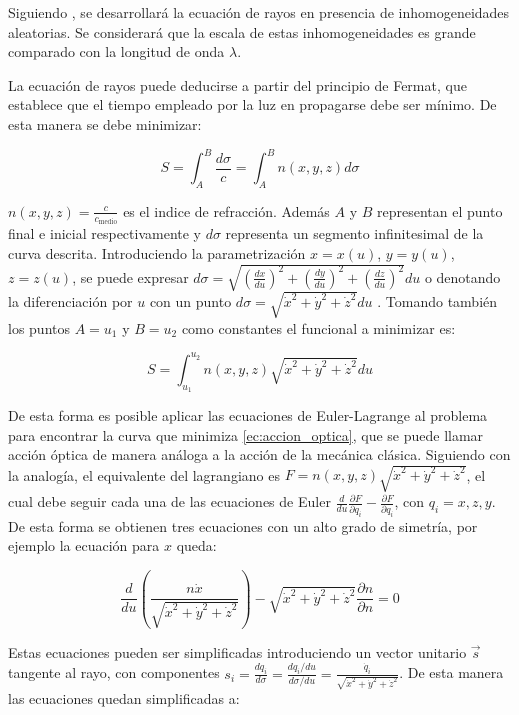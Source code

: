 Siguiendo \cite{chernov_wave_1967}, se desarrollará la ecuación de rayos en presencia de inhomogeneidades aleatorias. Se considerará que la escala de estas inhomogeneidades es grande comparado con la longitud de onda $\lambda$.

La ecuación de rayos puede deducirse a partir del principio de Fermat, que establece que el tiempo empleado por la luz en propagarse debe ser mínimo. De esta manera se debe minimizar: 

\begin{equation}
    S = \int_A^B\frac{d\sigma}{c} = \int_A^B n(x, y, z)d\sigma
\end{equation}

$n(x, y, z) = \frac{c}{c_{\text{medio}}}$ es el indice de refracción. Además $A$ y $B$ representan el punto final e inicial respectivamente y $d\sigma$ representa un segmento infinitesimal de la curva descrita. Introduciendo la parametrización $x = x(u)$, $y = y(u)$, $z = z(u)$, se puede expresar $d\sigma = \sqrt{\left(\frac{dx}{du}\right)^2 + \left(\frac{dy}{du}\right)^2 + \left(\frac{dz}{du}\right)^2}du$ o denotando la diferenciación por $u$ con un punto $d\sigma = \sqrt{\dot x^2 + \dot y^2 + \dot z^2}du$ . Tomando también los puntos $A = u_1$ y $B = u_2$ como constantes el funcional a minimizar es: 

\begin{equation}\label{ec:accion_optica}
    S = \int_{u_1}^{u_2}n(x, y, z)\sqrt{\dot x^2 + \dot y^2 + \dot z^2}du
\end{equation}

De esta forma es posible aplicar las ecuaciones de Euler-Lagrange al problema para encontrar la curva que minimiza \ref{ec:accion_optica}, que se puede llamar acción óptica de manera análoga a la acción de la mecánica clásica. Siguiendo con la analogía, el equivalente del lagrangiano es $F = n(x, y, z)\sqrt{\dot x^2 + \dot y^2 + \dot z^2}$, el cual debe seguir cada una de las ecuaciones de Euler $\frac{d}{du}\frac{\partial F}{\partial q_i} - \frac{\partial F}{\partial q_i}$, con $q_i = x, z, y$. De esta forma se obtienen tres ecuaciones con un alto grado de simetría, por ejemplo la ecuación para $x$ queda:

\begin{equation}
    \frac{d}{du}\left(\frac{n\dot x}{\sqrt{\dot x^2 + \dot y^2 + \dot z^2}}\right) - \sqrt{\dot x^2 + \dot y^2 + \dot z^2}\frac{\partial n}{\partial n} = 0
\end{equation}

Estas ecuaciones pueden ser simplificadas introduciendo un vector unitario $\vec s$ tangente al rayo, con componentes $s_i = \frac{d q_i}{d \sigma} = \frac{dq_i /du}{d\sigma/ du} =  \frac{\dot q_i}{\sqrt{\dot x^2 + \dot y^2 + \dot z^2}}$. De esta manera las ecuaciones quedan simplificadas a: 


